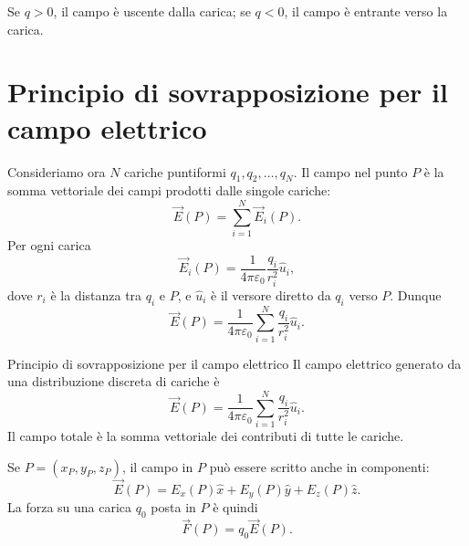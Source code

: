 \documentclass[a4paper]{article}
\begin{document}
\begin{center}
\end{center}

Se \(q>0\), il campo è uscente dalla carica; se \(q<0\), il campo è entrante verso la carica.

\section{Principio di sovrapposizione per il campo elettrico}

Consideriamo ora \(N\) cariche puntiformi \(q_1,q_2,\dots,q_N\). Il campo nel punto \(P\) è la somma vettoriale dei campi prodotti dalle singole cariche:
\[
    \vec{E}(P)=\sum_{i=1}^N\vec{E}_i(P).
\]
Per ogni carica
\[
    \vec{E}_i(P)=\frac{1}{4\pi\varepsilon_0}\frac{q_i}{r_i^2}\hat{u}_i,
\]
dove \(r_i\) è la distanza tra \(q_i\) e \(P\), e \(\hat{u}_i\) è il versore diretto da \(q_i\) verso \(P\). Dunque
\[
    \vec{E}(P)=\frac{1}{4\pi\varepsilon_0}\sum_{i=1}^N\frac{q_i}{r_i^2}\hat{u}_i.
\]

\begin{snippettheorem}{Principio di sovrapposizione per il campo elettrico}
    Il campo elettrico generato da una distribuzione discreta di cariche è
    \[
        \vec{E}(P)=\frac{1}{4\pi\varepsilon_0}\sum_{i=1}^N\frac{q_i}{r_i^2}\hat{u}_i.
    \]
    Il campo totale è la somma vettoriale dei contributi di tutte le cariche.
\end{snippettheorem}

Se \(P=(x_P,y_P,z_P)\), il campo in \(P\) può essere scritto anche in componenti:
\[
    \vec{E}(P)=E_x(P)\hat{x}+E_y(P)\hat{y}+E_z(P)\hat{z}.
\]
La forza su una carica \(q_0\) posta in \(P\) è quindi
\[
    \vec{F}(P)=q_0\vec{E}(P).
\]

\begin{center}
\end{center}
\end{document}
